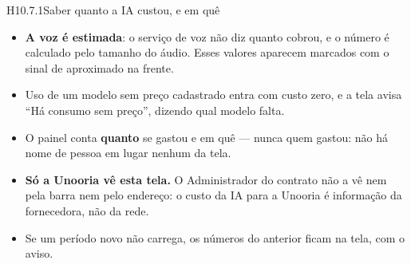 \begin{historia}{H10.7.1}{Saber quanto a IA custou, e em quê}{\pronto}
\begin{itemize}
  \item \textbf{A voz é estimada}: o serviço de voz não diz quanto cobrou, e o
    número é calculado pelo tamanho do áudio. Esses valores aparecem marcados
    com o sinal de aproximado na frente.
  \item Uso de um modelo sem preço cadastrado entra com custo zero, e a tela
    avisa \enquote{Há consumo sem preço}, dizendo qual modelo falta.
  \item O painel conta \textbf{quanto} se gastou e em quê --- nunca quem gastou:
    não há nome de pessoa em lugar nenhum da tela.
  \item \textbf{Só a Unooria vê esta tela.} O Administrador do contrato não a
    vê nem pela barra nem pelo endereço: o custo da IA para a Unooria é
    informação da fornecedora, não da rede.
  \item Se um período novo não carrega, os números do anterior ficam na tela,
    com o aviso.
\end{itemize}
\end{historia}

